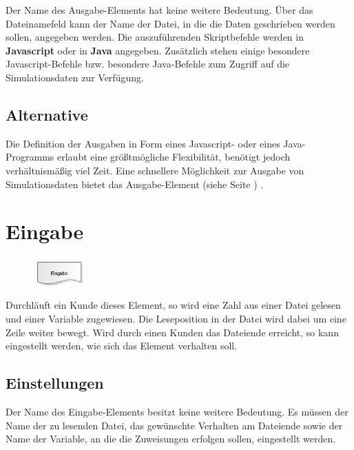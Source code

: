 Der Name des Ausgabe-Elements hat keine weitere Bedeutung. Über das Dateinamefeld kann der Name der Datei,
in die die Daten geschrieben werden sollen, angegeben werden. Die auszuführenden Skriptbefehle werden in
\textbf{Javascript} oder in \textbf{Java} angegeben. Zusätzlich stehen einige
besondere Javascript-Befehle bzw. besondere Java-Befehle 
zum Zugriff auf die Simulationsdaten zur Verfügung.

\subsection*{Alternative}

Die Definition der Ausgaben in Form eines Javascript- oder eines Java-Programms erlaubt eine größtmögliche Flexibilität,
benötigt jedoch verhältnismäßig viel Zeit. Eine schnellere Möglichkeit zur Ausgabe von Simulationsdaten
bietet das Ausgabe-Element (siehe Seite \pageref{ref:ModelElementOutput}) .


\section{Eingabe}
\label{ref:ModelElementInput}

\begin{figure}
\vspace{-22pt}
\includegraphics[width=2cm]{imageModelElementInput.png}
\vspace{-22pt}
\end{figure}

Durchläuft ein Kunde dieses Element, so wird eine Zahl aus einer Datei gelesen und einer
Variable zugewiesen. Die Leseposition in der Datei wird dabei um eine Zeile weiter bewegt.
Wird durch einen Kunden das Dateiende erreicht, so kann eingestellt werden, wie sich
das Element verhalten soll.

\subsection*{Einstellungen}

Der Name des Eingabe-Elements besitzt keine weitere Bedeutung. Es müssen der Name der zu lesenden
Datei, das gewünschte Verhalten am Dateiende sowie der Name der Variable, an die die Zuweisungen
erfolgen sollen, eingestellt werden.

